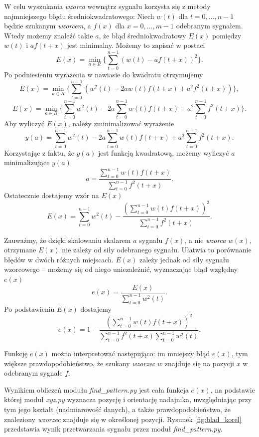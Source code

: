 W celu wyszukania \textit{wzorca} wewnątrz sygnału korzysta się z  metody najmniejszego błędu średniokwadratowego:
Niech $w(t)$  dla $t = 0, ..., n-1$ będzie szukanym \textit{wzorcem}, a $f(x)$ dla $x = 0, ..., m-1$ odebranym sygnałem.
Wtedy możemy znaleźć takie $a$, że błąd średniokwadratowy $E(x)$ pomiędzy $w(t)$ i $a f(t+x)$ jest minimalny.
Możemy to zapisać w postaci
\[
  E(x) = \min_{a \in R} \{ \sum_{t=0}^{n-1}  (w(t) - a f(t+x))^2 \}.
\]
Po podniesieniu wyrażenia w nawiasie do kwadratu otrzymujemy
\[
  E(x) = \min_{a \in R} \{ \sum_{t=0}^{n-1}  (w^2(t) -2a w(t) f(t+x) + a^2 f^2(t+x)) \},
\]
\[
  E(x) = \min_{a \in R} \{ \sum_{t=0}^{n-1}  w^2(t) -2a \sum_{t=0}^{n-1}  w(t) f(t+x) + a^2 \sum_{t=0}^{n-1} f^2(t+x) \}.
\]
Aby wyliczyć $E(x)$, należy zminimalizować wyrażenie
\[
  y(a) = \sum_{t=0}^{n-1}  w^2(t) -2a \sum_{t=0}^{n-1}  w(t) f(t+x) + a^2 \sum_{t=0}^{n-1} f^2(t+x).
\]
Korzystając z faktu, że $y(a)$ jest funkcją kwadratową, możemy wyliczyć $a$ minimalizujące $y(a)$
\[
  a = \frac{ \sum\limits_{t=0}^{n-1}  w(t) f(t+x) }{ \sum\limits_{t=0}^{n-1} f^2(t+x) }.
\]
Ostatecznie dostajemy wzór na $E(x)$
\[
  E(x) = \sum_{t=0}^{n-1}  w^2(t)  - \frac {\left(\sum\limits_{t=0}^{n-1}  w(t) f(t+x) \right)^2 } { \sum\limits_{t=0}^{n-1} f^2(t+x)}.
\]

Zauważmy, że dzięki skalowaniu skalarem $a$  sygnału $f(x)$, a nie \textit{wzorca} $w(x)$,
otrzymane $E(x)$ nie zależy od siły odebranego sygnału. Ułatwia to porównanie błędów w dwóch różnych miejscach.
$E(x)$ zależy jednak od siły sygnału wzorcowego -- możemy się od niego  uniezależnić, wyznaczając
błąd względny $e(x)$
\[
  e(x) = \frac{E(x)}{\sum\limits_{t=0}^{n-1}  w^2(t)}.
\]
Po podstawieniu $E(x)$ dostajemy
\[
  e(x) = 1 - \frac {\left(\sum\limits_{t=0}^{n-1}  w(t) f(t+x) \right)^2 } { \sum\limits_{t=0}^{n-1} f^2(t+x) \sum\limits_{t=0}^{n-1}  w^2(t)}.
\]
 
 Funkcję $e(x)$  można interpretować następująco:
 im mniejszy błąd $e(x)$, tym większe prawdopodobieństwo, że szukany \textit{wzorzec} $w$ znajduje się na pozycji $x$ w 
 odebranym sygnale $f$. 

 Wynikiem obliczeń modułu \textit{find\_pattern.py} jest cała funkcja $e(x)$, na podstawie której moduł \textit{xyz.py}
 wyznacza pozycję i orientację nadajnika, uwzględniając przy tym 
 jego kształt (nadmiarowość danych), a także prawdopodobieństwo, że znaleziony \textit{wzorzec} znajduje się w określonej pozycji.
 Rysunek \ref{fig:blad_korel} przedstawia wynik przetwarzania sygnału przez moduł \textit{find\_pattern.py}.

